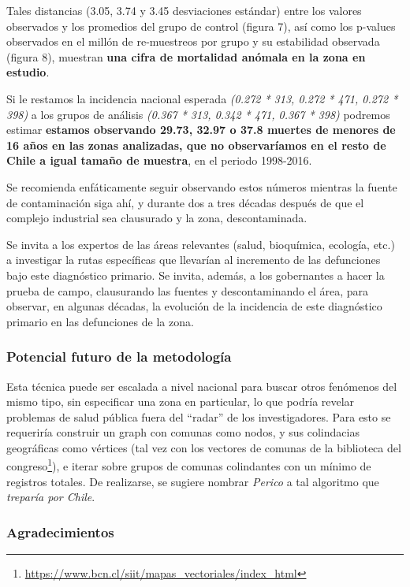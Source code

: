 \documentclass[]{article}
\DeclareRobustCommand{\href}[2]{#2\footnote{\url{#1}}}
\begin{document}
Tales distancias (3.05, 3.74 y 3.45 desviaciones estándar) entre los
valores observados y los promedios del grupo de control (figura 7), así
como los p-values observados en el millón de re-muestreos por grupo y su
estabilidad observada (figura 8), muestran \textbf{una cifra de mortalidad anómala en la zona en estudio}.

Si le restamos la incidencia nacional esperada \emph{(0.272 * 313, 0.272
* 471, 0.272 * 398)} a los grupos de análisis \emph{(0.367 * 313, 0.342
* 471, 0.367 * 398)} podremos estimar \textbf{estamos observando 29.73,
32.97 o 37.8 muertes de menores de 16 años en las zonas analizadas, que
no observaríamos en el resto de Chile a igual tamaño de muestra}, en el
periodo 1998-2016.

Se recomienda enfáticamente seguir observando estos números mientras la
fuente de contaminación siga ahí, y durante dos a tres décadas después
de que el complejo industrial sea clausurado y la zona, descontaminada.

Se invita a los expertos de las áreas relevantes (salud, bioquímica,
ecología, etc.) a investigar la rutas específicas que llevarían al
incremento de las defunciones bajo este diagnóstico primario. Se invita,
además, a los gobernantes a hacer la prueba de campo, clausurando las
fuentes y descontaminando el área, para observar, en algunas décadas, la
evolución de la incidencia de este diagnóstico primario en las
defunciones de la zona.

\hypertarget{potencial-futuro-de-la-metodologuxeda}{%
\subsubsection{Potencial futuro de la
metodología}\label{potencial-futuro-de-la-metodologuxeda}}

Esta técnica puede ser escalada a nivel nacional para buscar otros
fenómenos del mismo tipo, sin especificar una zona en particular, lo que
podría revelar problemas de salud pública fuera del ``radar'' de los
investigadores. Para esto se requeriría construir un graph con comunas
como nodos, y sus colindacias geográficas como vértices (tal vez con
\href{https://www.bcn.cl/siit/mapas_vectoriales/index_html}{los vectores
de comunas de la biblioteca del congreso}), e iterar sobre grupos de
comunas colindantes con un mínimo de registros totales. De realizarse,
se sugiere nombrar \emph{Perico} a tal algoritmo que \emph{treparía por
Chile}.

\hypertarget{agradecimientos}{%
\subsubsection{Agradecimientos}\label{agradecimientos}}
\end{document}
